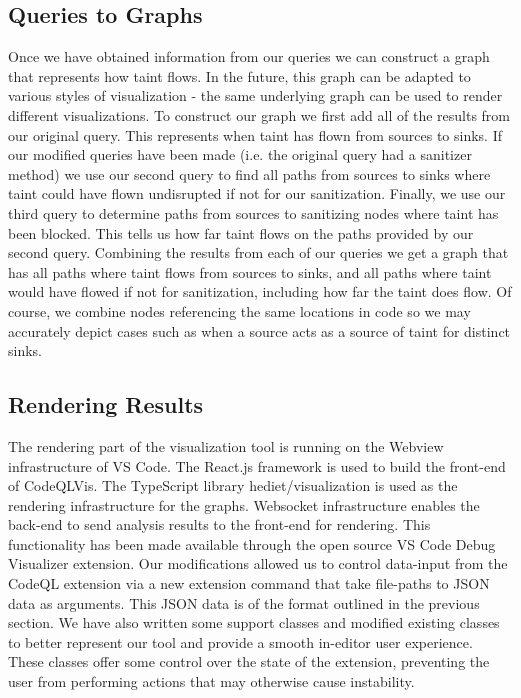 \documentclass[sigplan,10pt,review]{acmart}
\begin{document}
\subsection{Queries to Graphs}
Once we have obtained information from our queries we can construct a graph that represents how taint flows. In the future, this graph can be adapted to various styles of visualization - the same underlying graph can be used to render different visualizations.
\newline
\indent To construct our graph we first add all of the results from our original query. This represents when taint has flown from sources to sinks. If our modified queries have been made (i.e. the original query had a sanitizer method) we use our second query to find all paths from sources to sinks where taint could have flown undisrupted if not for our sanitization. Finally, we use our third query to determine paths from sources to sanitizing nodes where taint has been blocked. This tells us how far taint flows on the paths provided by our second query. Combining the results from each of our queries we get a graph that has all paths where taint flows from sources to sinks, and all paths where taint would have flowed if not for sanitization, including how far the taint does flow. Of course, we combine nodes referencing the same locations in code so we may accurately depict cases such as when a source acts as a source of taint for distinct sinks.

\subsection{Rendering Results}
The rendering part of the visualization tool is running on the Webview infrastructure of VS Code. The React.js framework is used to build the front-end of CodeQLVis. The TypeScript library hediet/visualization is used as the rendering infrastructure for the graphs. Websocket infrastructure enables the back-end to send analysis results to the front-end for rendering.
\newline
\indent This functionality has been made available through the open source VS Code Debug Visualizer extension. Our modifications allowed us to control data-input from the CodeQL extension via a new extension command that take file-paths to JSON data as arguments. This JSON data is of the format outlined in the previous section.
\newline
\indent We have also written some support classes and modified existing classes to better represent our tool and provide a smooth in-editor user experience. These classes offer some control over the state of the extension, preventing the user from performing actions that may otherwise cause instability.
\end{document}
